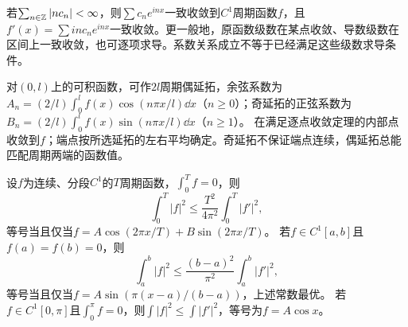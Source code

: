 \begin{result}[逐项求导的充分条件]\label{st:differentiate}
若$\sum_{n\in\mathbb Z}|n c_n|<\infty$，则$\sum c_ne^{inx}$一致收敛到$C^1$周期函数$f$，且
$f'(x)=\sum in c_ne^{inx}$一致收敛。更一般地，原函数级数在某点收敛、导数级数在区间上一致收敛，也可逐项求导。系数关系成立不等于已经满足这些级数求导条件。
\end{result}
\begin{result}[半区间展开及端点]\label{st:half}
对$(0,l)$上的可积函数，可作$2l$周期偶延拓，余弦系数为
$A_n=(2/l)\int_0^lf(x)\cos(n\pi x/l)\dd x$（$n\ge0$）；奇延拓的正弦系数为
$B_n=(2/l)\int_0^lf(x)\sin(n\pi x/l)\dd x$（$n\ge1$）。
在满足逐点收敛定理的内部点收敛到$f$；端点按所选延拓的左右平均确定。奇延拓不保证端点连续，偶延拓总能匹配周期两端的函数值。
\end{result}
\begin{result}\label{st:Wirtinger}
设$f$为连续、分段$C^1$的$T$周期函数，$\int_0^Tf=0$，则
\[
 \int_0^T|f|^2\le\frac{T^2}{4\pi^2}\int_0^T|f'|^2,
\]
等号当且仅当$f=A\cos(2\pi x/T)+B\sin(2\pi x/T)$。
若$f\in C^1[a,b]$且$f(a)=f(b)=0$，则
\[
 \int_a^b|f|^2\le\frac{(b-a)^2}{\pi^2}\int_a^b|f'|^2,
\]
等号当且仅当$f=A\sin(\pi(x-a)/(b-a))$，上述常数最优。
若$f\in C^1[0,\pi]$且$\int_0^\pi f=0$，则$\int|f|^2\le\int|f'|^2$，等号为$f=A\cos x$。
\end{result}

